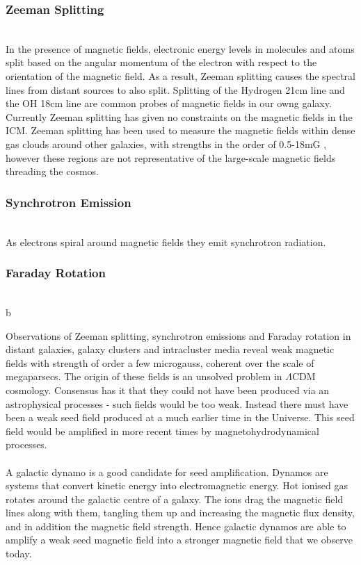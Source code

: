 \subsubsection*{Zeeman Splitting}
\\
In the presence of magnetic fields, electronic energy levels in molecules and atoms split based on the angular momentum of the electron with respect to the orientation of the magnetic field. As a result, Zeeman splitting causes the spectral lines from distant sources to also split. Splitting of the Hydrogen 21cm line and the OH 18cm line are common probes of magnetic fields in our owng galaxy. Currently Zeeman splitting has given no constraints on the magnetic fields in the ICM. Zeeman splitting has been used to measure the magnetic fields within dense gas clouds around other galaxies, with strengths in the order of 0.5-18mG \cite{Robishaw:2008ti}, however these regions are not representative of the large-scale magnetic fields threading the cosmos.
\subsubsection*{Synchrotron Emission}
\\
As electrons spiral around magnetic fields they emit synchrotron radiation. 
\subsubsection*{Faraday Rotation}
\\
b

Observations of Zeeman splitting, synchrotron emissions and Faraday rotation in distant galaxies, galaxy clusters and intracluster media reveal weak magnetic fields with strength of order a few microgauss, coherent over the scale of megaparsecs. The origin of these fields is an unsolved problem in $\Lambda$CDM cosmology. Consensus has it that they could not have been produced via an astrophysical processes - such fields would be too weak. Instead there must have been a weak seed field produced at a much earlier time in the Universe. This seed field would be amplified in more recent times by magnetohydrodynamical processes.
\\\\
A galactic dynamo is a good candidate for seed amplification. Dynamos are systems that convert kinetic energy into electromagnetic energy. Hot ionised gas rotates around the galactic centre of a galaxy. The ions drag the magnetic field lines along with them, tangling them up and increasing the magnetic flux density, and in addition the magnetic field strength. Hence galactic dynamos are able to amplify a weak seed magnetic field into a stronger magnetic field that we observe today.





